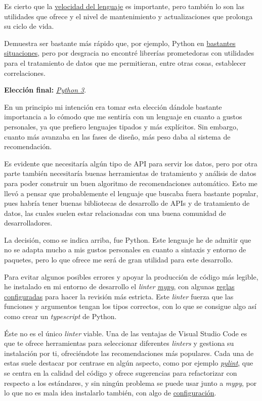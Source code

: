 Es cierto que la \href{https://benchmarksgame-team.pages.debian.net/benchmarksgame/index.html}{velocidad del lenguaje} es importante, pero también lo son las utilidades que ofrece y el nivel de mantenimiento y actualizaciones que prolonga su ciclo de vida.

Demuestra ser bastante más rápido que, por ejemplo, Python en \href{https://benchmarksgame-team.pages.debian.net/benchmarksgame/fastest/go-python3.html}{bastantes situaciones}, pero por desgracia no encontré librerías prometedoras con utilidades para el tratamiento de datos que me permitieran, entre otras cosas, establecer correlaciones.

\textbf{Elección final:} \href{https://www.python.org/}{\textit{Python 3}}.

En un principio mi intención era tomar esta elección dándole bastante importancia a lo cómodo que me sentiría con un lenguaje en cuanto a gustos personales, ya que prefiero lenguajes tipados y más explícitos. Sin embargo, cuanto más avanzaba en las fases de diseño, más peso daba al sistema de recomendación. 

Es evidente que necesitaría algún tipo de API para servir los datos, pero por otra parte también necesitaría buenas herramientas de tratamiento y análisis de datos para poder construir un buen algoritmo de recomendaciones automático. Esto me llevó a pensar que probablemente el lenguaje que buscaba fuera bastante popular, pues habría tener buenas bibliotecas de desarrollo de APIs y de tratamiento de datos, las cuales suelen estar relacionadas con una buena comunidad de desarrolladores.

La decisión, como se indica arriba, fue Python. Este lenguaje he de admitir que no se adapta mucho a mis gustos personales en cuanto a sintaxis y entorno de paquetes, pero lo que ofrece me será de gran utilidad para este desarrollo.

Para evitar algunos posibles errores y apoyar la producción de código más legible, he instalado en mi entorno de desarrollo el \textit{linter} \href{http://mypy-lang.org/}{\textit{mypy}}, con algunas \href{https://github.com/Anglepi/My-Many-Reads/blob/main/.mypy.ini}{reglas configuradas} para hacer la revisión más estricta. Este \textit{linter} fuerza que las funciones y argumentos tengan los tipos correctos, con lo que se consigue algo así como crear un \textit{typescript} de Python.

Éste no es el único \textit{linter} viable. Una de las ventajas de Visual Studio Code es que te ofrece herramientas para seleccionar diferentes \textit{linters} y gestiona su instalación por ti, ofreciéndote las recomendaciones más populares. Cada una de estas suele destacar por centrase en algún aspecto, como por ejemplo \href{https://pypi.org/project/pylint/}{\textit{pylint}}, que se centra en la calidad del código y ofrece sugerencias para refactorizar con respecto a los estándares, y sin ningún problema se puede usar junto a \textit{mypy}, por lo que no es mala idea instalarlo también, con algo de \href{https://github.com/Anglepi/My-Many-Reads/blob/main/.pylintrc.ini}{configuración}.


